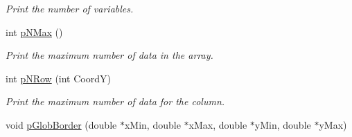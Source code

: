\begin{DoxyCompactItemize}
\begin{DoxyCompactList}\small\item\em Print the number of variables. \end{DoxyCompactList}\item 
int \hyperlink{classVarDatFile_a9dcafc8ed48e17a6980b121cb76e56fa}{p\+N\+Max} ()\hypertarget{classVarDatFile_a9dcafc8ed48e17a6980b121cb76e56fa}{}\label{classVarDatFile_a9dcafc8ed48e17a6980b121cb76e56fa}

\begin{DoxyCompactList}\small\item\em Print the maximum number of data in the array. \end{DoxyCompactList}\item 
int \hyperlink{classVarDatFile_a48d99b519007370b7b0657a1f6665c27}{p\+N\+Row} (int CoordY)\hypertarget{classVarDatFile_a48d99b519007370b7b0657a1f6665c27}{}\label{classVarDatFile_a48d99b519007370b7b0657a1f6665c27}

\begin{DoxyCompactList}\small\item\em Print the maximum number of data for the column. \end{DoxyCompactList}\item 
void \hyperlink{classVarDatFile_a8209ef54a8a7b2173ce491cba2008c56}{p\+Glob\+Border} (double $\ast$x\+Min, double $\ast$x\+Max, double $\ast$y\+Min, double $\ast$y\+Max)\hypertarget{classVarDatFile_a8209ef54a8a7b2173ce491cba2008c56}{}\label{classVarDatFile_a8209ef54a8a7b2173ce491cba2008c56}


\end{DoxyCompactItemize}
